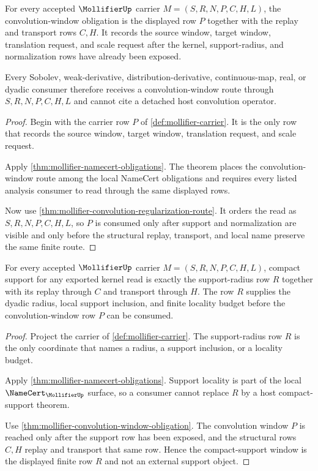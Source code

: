 \begin{theorem}
\label{thm:mollifier-convolution-window-obligation}
For every accepted $\MollifierUp$ carrier $M=(S,R,N,P,C,H,L)$, the convolution-window obligation is the displayed row $P$ together with the replay and transport rows $C,H$. It records the source window, target window, translation request, and scale request after the kernel, support-radius, and normalization rows have already been exposed.

Every Sobolev, weak-derivative, distribution-derivative, continuous-map, real, or dyadic consumer therefore receives a convolution-window route through $S,R,N,P,C,H,L$ and cannot cite a detached host convolution operator.
\end{theorem}
\begin{proof}
Begin with the carrier row $P$ of \autoref{def:mollifier-carrier}. It is the only row that records the source window, target window, translation request, and scale request.

Apply \autoref{thm:mollifier-namecert-obligations}. The theorem places the convolution-window route among the local NameCert obligations and requires every listed analysis consumer to read through the same displayed rows.

Now use \autoref{thm:mollifier-convolution-regularization-route}. It orders the read as $S,R,N,P,C,H,L$, so $P$ is consumed only after support and normalization are visible and only before the structural replay, transport, and local name preserve the same finite route.
\end{proof}

\begin{theorem}
\label{thm:mollifier-compact-support-window}
For every accepted $\MollifierUp$ carrier $M=(S,R,N,P,C,H,L)$, compact support for any exported kernel read is exactly the support-radius row $R$ together with its replay through $C$ and transport through $H$. The row $R$ supplies the dyadic radius, local support inclusion, and finite locality budget before the convolution-window row $P$ can be consumed.
\end{theorem}
\begin{proof}
Project the carrier of \autoref{def:mollifier-carrier}. The support-radius row $R$ is the only coordinate that names a radius, a support inclusion, or a locality budget.

Apply \autoref{thm:mollifier-namecert-obligations}. Support locality is part of the local $\NameCert_{\MollifierUp}$ surface, so a consumer cannot replace $R$ by a host compact-support theorem.

Use \autoref{thm:mollifier-convolution-window-obligation}. The convolution window $P$ is reached only after the support row has been exposed, and the structural rows $C,H$ replay and transport that same row. Hence the compact-support window is the displayed finite row $R$ and not an external support object.
\end{proof}

